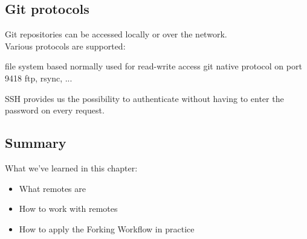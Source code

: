 \subsection{Git protocols}
\begin{frame}[fragile]
  \subslidetitle
  Git repositories can be accessed locally or over the network.
  \\
  \vspace{1em}
  Various protocols are supported:
  \begin{itemize}
    {file system based}
      {normally used for read-write access}
      {git native protocol on port 9418}
   {ftp, rsync, ...}
  \end{itemize}
  \vspace{1em}

  SSH provides us the possibility to authenticate without having to enter the password on every request.
\end{frame}

\subsection{Summary}
\begin{frame}[fragile]
\subslidetitle
  What we've learned in this chapter:
  \begin{itemize}
    \item What remotes are
    \item How to work with remotes
    \item How to apply the Forking Workflow in practice
  \end{itemize}
\end{frame}
